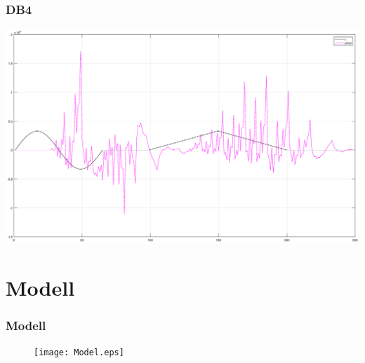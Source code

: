 \documentclass[english, aspectratio=169]{beamer}
\begin{document}
\begin{frame}
\frametitle{DB4}
\centering
	\includegraphics[scale=0.29]{db4.eps}
\end{frame}














\section{Modell} 
\begin{frame}
	\frametitle{Modell}
	\begin{figure}
		\texttt{[image: Model.eps]}
	\end{figure}
\end{frame}
\end{document}

